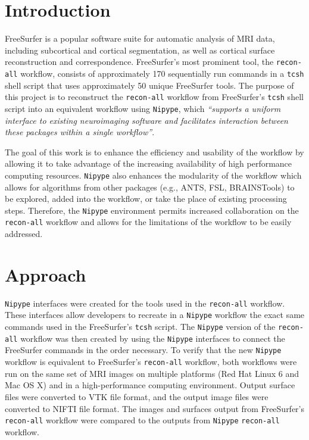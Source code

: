\documentclass[twocolumn]{bmcart}%
\begin{document}

\section{Introduction}\label{introduction}

FreeSurfer\cite{Fischl2012} is a popular software suite for automatic analysis of MRI data, including subcortical and cortical segmentation, as well as cortical surface reconstruction and correspondence.
FreeSurfer's most prominent tool, the \texttt{recon-all} workflow, consists of approximately 170 sequentially run commands in a \texttt{tcsh} shell script that uses approximately 50 unique FreeSurfer tools.
The purpose of this project is to reconstruct the  \texttt{recon-all} workflow from FreeSurfer's \texttt{tcsh} shell script into an equivalent workflow using \texttt{Nipype}, which \textit{``supports a uniform interface to existing neuroimaging software and facilitates interaction between these packages within a single workflow''}\cite{Gorgolewski2011}. 

The goal of this work is to enhance the efficiency and usability of the workflow by allowing it to take advantage of the increasing availability of high performance computing resources.
\texttt{Nipype} also enhances the modularity of the workflow which allows for algorithms from other packages (e.g., ANTS\cite{Avants2009}, FSL\cite{Woolrich2009}, BRAINSTools\cite{YoungKim2013}\cite{Kim2014}\cite{Kim2015}) to be explored, added into the workflow, or take the place of existing processing steps.
Therefore, the \texttt{Nipype} environment permits increased collaboration on the \texttt{recon-all} workflow and allows for the limitations of the workflow to be easily addressed.


\section{Approach}\label{approach}
\texttt{Nipype} interfaces were created for the tools used in the \texttt{recon-all} workflow. 
These interfaces allow developers to recreate in a  \texttt{Nipype} workflow the exact same commands used in the FreeSurfer's \texttt{tcsh} script. 
The \texttt{Nipype} version of the \texttt{recon-all} workflow was then created by using the \texttt{Nipype} interfaces to connect the FreeSurfer commands in the order necessary. 
To verify that the new \texttt{Nipype} workflow is equivalent to FreeSurfer's \texttt{recon-all} workflow, both workflows were run on the same set of MRI images on multiple platforms (Red Hat Linux 6 and Mac OS X) and in a high-performance computing environment. 
Output surface files were converted to VTK file format, and the output image files were converted to NIFTI file format.
The images and surfaces output from FreeSurfer's \texttt{recon-all} workflow were compared to the outputs from  \texttt{Nipype} \texttt{recon-all} workflow.
\end{document}
